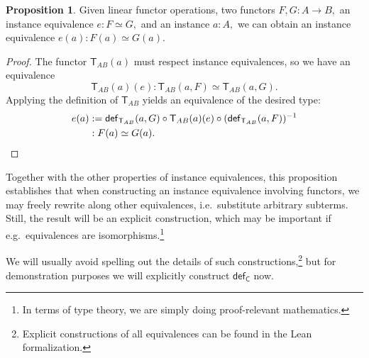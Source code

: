 \documentclass[a4paper]{article}
\theoremstyle{definition}
\newtheorem{proposition}[definition]{Proposition}
\theoremstyle{remark}
\renewcommand{\equiv}{\simeq}
\newcommand{\nm}{\mathsf}
\newcommand{\fndef}[1]{\nm{def}_{#1}}
\newcommand{\combinator}{\nm}
\newcommand{\revAppFun}{\combinator{T}}
\newcommand{\swapFun}{\combinator{C}}
\begin{document}
\begin{proposition}
  \label{prp:congrfun}
  Given linear functor operations, two functors $F,G : A \to B,$ an instance equivalence
  $e : F \equiv G,$ and an instance $a : A,$ we can obtain an instance equivalence
  $e(a) : F(a) \equiv G(a).$
\end{proposition}
\vspace{-1ex}
\begin{proof}
  The functor $\revAppFun_{AB}(a)$ must respect instance equivalences, so we have an equivalence
  \[\revAppFun_{AB}(a)(e) : \revAppFun_{AB}(a,F) \equiv \revAppFun_{AB}(a,G).\]
  Applying the definition of $\revAppFun_{AB}$ yields an equivalence of the desired type:
  \begin{align*}
    e(a) &:= \fndef{\revAppFun_{AB}}(a,G) \circ \revAppFun_{AB}(a)(e) \circ (\fndef{\revAppFun_{AB}}(a,F))^{-1}\\
         &: F(a) \equiv G(a).
    \qedhere
  \end{align*}
\end{proof}

Together with the other properties of instance equivalences, this proposition establishes
that when constructing an instance equivalence involving functors, we may freely rewrite
along other equivalences, i.e.\ substitute arbitrary subterms. Still, the result will be an
explicit construction, which may be important if e.g.\ equivalences are
isomorphisms.\footnote{In terms of type theory, we are simply doing proof-relevant mathematics.}

We will usually avoid spelling out the details of such constructions,\footnote{Explicit
constructions of all equivalences can be found in the Lean formalization.} but for
demonstration purposes we will explicitly construct $\fndef{\swapFun}$ now.
\end{document}
